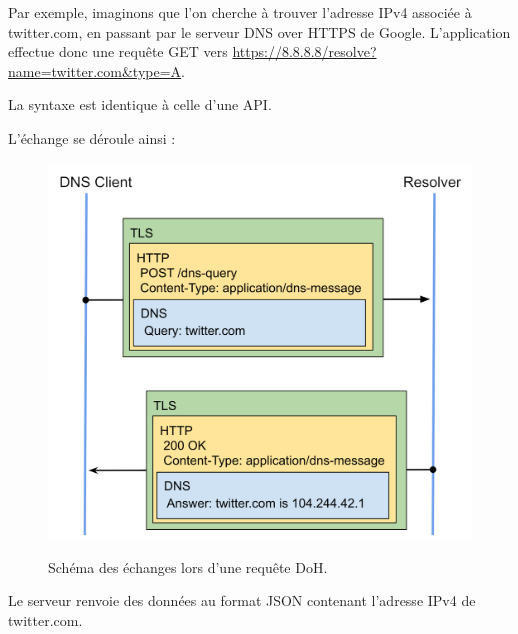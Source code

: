 \documentclass[a4paper,12pt]{article}
\begin{document}
	Par exemple, imaginons que l'on cherche à trouver l'adresse IPv4 associée à twitter.com, en passant par le serveur DNS over HTTPS de Google.
	L'application effectue donc une requête GET vers \url{https://8.8.8.8/resolve?name=twitter.com&type=A}.
	
	La syntaxe est identique à celle d'une API.
	
	\newpage
	
	L'échange se déroule ainsi :
	\begin{figure}[H]
		\begin{center}
			{\includegraphics[scale=0.2]{Images/tls-example.png}}
		\end{center}
		\caption{Schéma des échanges lors d'une requête DoH.}
	\end{figure}
	
	Le serveur renvoie des données au format JSON contenant l'adresse IPv4 de twitter.com.
	
\end{document}
